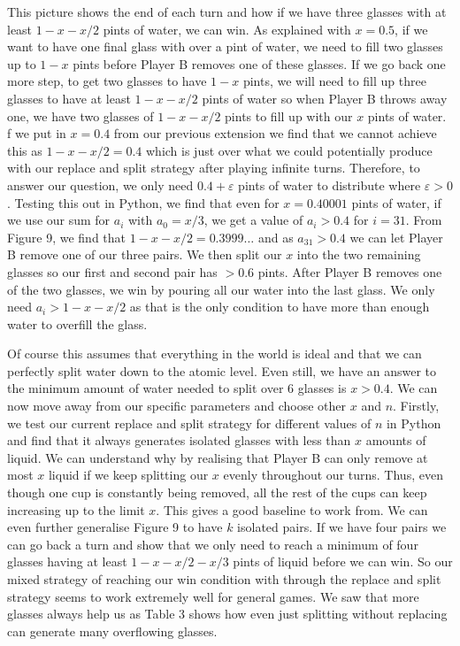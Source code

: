 \documentclass[11pt]{article}
\newcommand{\keywordfont}{\textsc}
\newcommand{\keyword}[1]{%
  \marginpar{\raggedright\small\keywordfont{#1}}}
\begin{document}
This picture shows the end of each turn and how if we have three glasses with at least $1-x-x/2$ pints of water, we can win. As explained with $x=0.5$, if we want to have one final glass with over a pint of water, we need to fill two glasses up to $1-x$ pints before Player B removes one of these glasses. If we go back one more step, to get two glasses to have $1-x$ pints, we will need to fill up three glasses to have at least $1-x-x/2$ pints of water so when Player B throws away one, we have two glasses of $1-x-x/2$ pints to fill up with our $x$ pints of water. \keyword{AHA} f we put in $x=0.4$ from our previous extension we find that we cannot achieve this as $1-x-x/2=0.4$ which is just over what we could potentially produce with our replace and split strategy after playing infinite turns. Therefore, to answer our question, we only need $0.4+\varepsilon$ pints of water to distribute where $\varepsilon>0$. \keyword{Check} Testing this out in Python, we find that even for $x=0.40001$ pints of water, if we use our sum for $a_i$ with $a_0=x/3$, we get a value of $a_i>0.4$ for $i=31$. From Figure 9, we find that $1-x-x/2=0.3999\dots$ and as $a_{31}>0.4$ we can let Player B remove one of our three pairs. We then split our $x$ into the two remaining glasses so our first and second pair has $>0.6$ pints. After Player B removes one of the two glasses, we win by pouring all our water into the last glass. \keyword{Clarification} We only need $a_i>1-x-x/2$ as that is the only condition to have more than enough water to overfill the glass.

Of course \keyword{Assumption} this assumes that everything in the world is ideal and that we can perfectly split water down to the atomic level. Even still, we have an answer to the minimum amount of water needed to split over 6 glasses is $x>0.4$. We can now move away from our specific parameters \keyword{Extension} and choose other $x$ and $n$. Firstly, we test our \keyword{Try} current replace and split strategy for different values of $n$ in Python and find that it always generates isolated glasses with less than $x$ amounts of liquid. We can \keyword{Justify} understand why by realising that Player B can only remove at most $x$ liquid if we keep splitting our $x$ evenly throughout our turns. Thus, even though one cup is constantly being removed, all the rest of the cups can keep increasing up to the limit $x$. This gives a good baseline to work from. We can even further generalise \keyword{AHA} Figure 9 to have $k$ isolated pairs. If we have four pairs we can go back a turn and show that we only need to reach a minimum of four glasses having at least $1-x-x/2-x/3$ pints of liquid before we can win. So our mixed strategy of reaching our win condition with through the replace and split strategy seems to work extremely well for general games. We saw that more glasses always help us as Table 3 shows how even just splitting without replacing can generate many overflowing glasses.
\end{document}
